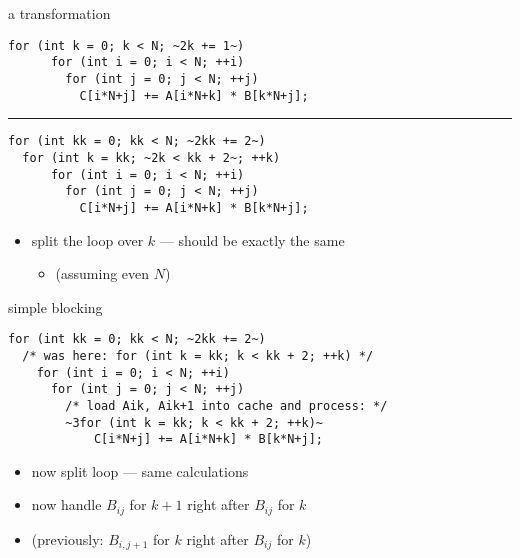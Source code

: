 \begin{frame}[fragile,label=cacheBlockKPrep]{a transformation}
\begin{lstlisting}
for (int k = 0; k < N; ~2k += 1~)
      for (int i = 0; i < N; ++i)
        for (int j = 0; j < N; ++j)
          C[i*N+j] += A[i*N+k] * B[k*N+j];
\end{lstlisting}
\hrule
\begin{lstlisting}
for (int kk = 0; kk < N; ~2kk += 2~)
  for (int k = kk; ~2k < kk + 2~; ++k)
      for (int i = 0; i < N; ++i)
        for (int j = 0; j < N; ++j)
          C[i*N+j] += A[i*N+k] * B[k*N+j];
\end{lstlisting}
\begin{itemize}
\item split the loop over $k$ --- should be exactly the same 
    \begin{itemize}
    \item (assuming even $N$)
    \end{itemize}
\end{itemize}
\end{frame}

\begin{frame}[fragile,label=cacheBlockK]{simple blocking}
\begin{lstlisting}
for (int kk = 0; kk < N; ~2kk += 2~)
  /* was here: for (int k = kk; k < kk + 2; ++k) */
    for (int i = 0; i < N; ++i)
      for (int j = 0; j < N; ++j)
        /* load Aik, Aik+1 into cache and process: */
        ~3for (int k = kk; k < kk + 2; ++k)~
            C[i*N+j] += A[i*N+k] * B[k*N+j];
\end{lstlisting}
\begin{itemize}
\item now  split loop --- same calculations
\item<2-> now handle $B_{ij}$ for $k+1$ right after $B_{ij}$ for $k$
\item<2-> (previously: $B_{i,j+1}$ for $k$ right after $B_{ij}$ for $k$)
\end{itemize}
\end{frame}

